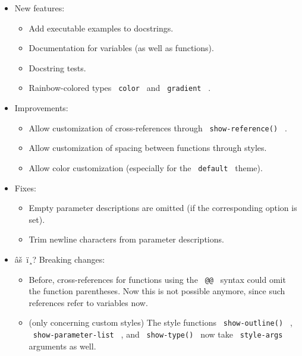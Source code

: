 \begin{itemize}
\tightlist
\item
  New features:

  \begin{itemize}
  \tightlist
  \item
    Add executable examples to docstrings.
  \item
    Documentation for variables (as well as functions).
  \item
    Docstring tests.
  \item
    Rainbow-colored types \texttt{\ color\ } and \texttt{\ gradient\ } .
  \end{itemize}
\item
  Improvements:

  \begin{itemize}
  \tightlist
  \item
    Allow customization of cross-references through
    \texttt{\ show-reference()\ } .
  \item
    Allow customization of spacing between functions through styles.
  \item
    Allow color customization (especially for the \texttt{\ default\ }
    theme).
  \end{itemize}
\item
  Fixes:

  \begin{itemize}
  \tightlist
  \item
    Empty parameter descriptions are omitted (if the corresponding
    option is set).
  \item
    Trim newline characters from parameter descriptions.
  \end{itemize}
\item
  âš~ï¸? Breaking changes:

  \begin{itemize}
  \tightlist
  \item
    Before, cross-references for functions using the \texttt{\ @@\ }
    syntax could omit the function parentheses. Now this is not possible
    anymore, since such references refer to variables now.
  \item
    (only concerning custom styles) The style functions
    \texttt{\ show-outline()\ } , \texttt{\ show-parameter-list\ } , and
    \texttt{\ show-type()\ } now take \texttt{\ style-args\ } arguments
    as well.
  \end{itemize}
\end{itemize}

